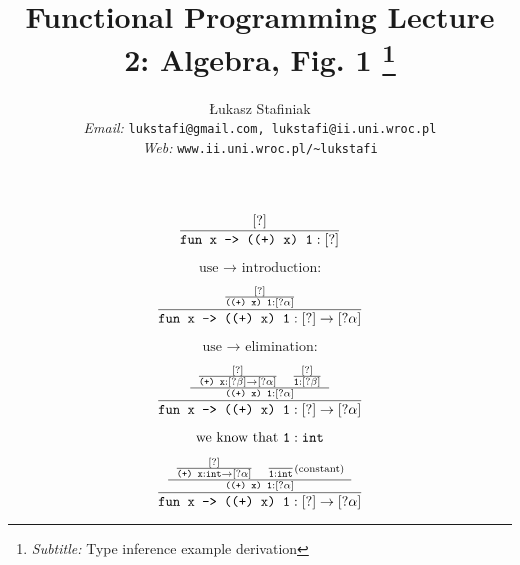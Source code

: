 \documentclass{article}
\newcommand{\tmemail}[1]{\\ \textit{Email:} \texttt{#1}}
\newcommand{\tmhomepage}[1]{\\ \textit{Web:} \texttt{#1}}
\newcommand{\tmsubtitle}[1]{\thanks{\textit{Subtitle:} #1}}
\newcommand{\tmverbatim}[1]{\text{{\ttfamily{#1}}}}
\begin{document}
\title{Functional Programming}

\author{
  {\L}ukasz Stafiniak
  \tmemail{lukstafi@gmail.com, lukstafi@ii.uni.wroc.pl}
  \tmhomepage{www.ii.uni.wroc.pl/\~{}lukstafi}
}

\maketitle

\title{
  Lecture 2: Algebra, Fig. 1
  \tmsubtitle{Type inference example derivation}
}

\maketitle

{\newpage}

{\LARGE{\[ \frac{[?]}{\text{\tmverbatim{fun x -> ((+) x) 1}} : [?]} \]}}

{\newpage}

{\LARGE{\[ \text{use } \rightarrow \text{ introduction:} \]}}

{\newpage}

{\LARGE{\[ \frac{\frac{[?]}{\text{\tmverbatim{((+) x) 1}} : [?
   \alpha]}}{\text{\tmverbatim{fun x -> ((+) x) 1}} : [?] \rightarrow [?
   \alpha]} \]}}

{\newpage}

{\LARGE{\[ \text{use } \rightarrow \text{ elimination:} \]}}

{\newpage}

{\LARGE{\[ \frac{\frac{\begin{array}{ll}
     \frac{[?]}{\text{\tmverbatim{(+) x}} : [? \beta] \rightarrow [? \alpha]}
     & \frac{[?]}{\text{\tmverbatim{1}} : [? \beta]}
   \end{array}}{\text{\tmverbatim{((+) x) 1}} : [?
   \alpha]}}{\text{\tmverbatim{fun x -> ((+) x) 1}} : [?] \rightarrow [?
   \alpha]} \]}}

{\newpage}

{\LARGE{\[ \text{we know that \tmverbatim{1}} : \text{\tmverbatim{int}} \]}}

{\newpage}

{\LARGE{\[ \frac{\frac{\begin{array}{ll}
     \frac{[?]}{\text{\tmverbatim{(+) x}} : \text{\tmverbatim{int}}
     \rightarrow [? \alpha]} & \frac{}{\text{\tmverbatim{1}} :
     \text{\tmverbatim{int}}} \scriptsize{\text{(constant)}}
   \end{array}}{\text{\tmverbatim{((+) x) 1}} : [?
   \alpha]}}{\text{\tmverbatim{fun x -> ((+) x) 1}} : [?] \rightarrow [?
   \alpha]} \]}}
\end{document}

